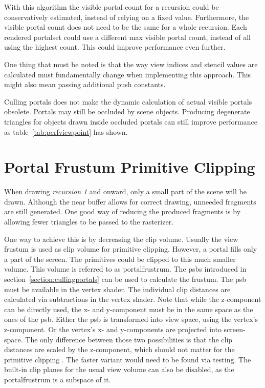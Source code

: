 With this algorithm the visible portal count for a recursion could be conservatively estimated, instead of relying on a fixed value. Furthermore, the visible portal count does not need to be the same for a whole recursion. Each rendered \gls{portalset} could use a different max visible portal count, instead of all using the highest count. This could improve performance even further.

One thing that must be noted is that the way view indices and stencil values are calculated must fundamentally change when implementing this approach. This might also mean passing additional push constants.

Culling portals does not make the dynamic calculation of actual visible portals obsolete. Portals may still be occluded by scene objects. Producing degenerate triangles for objects drawn inside occluded portals can still improve performance as table~\ref{tab:perfviewpoint} has shown.

\section{Portal Frustum Primitive Clipping}
\label{section:portalprimitiveclipping}

When drawing \textit{recursion 1} and onward, only a small part of the scene will be drawn. Although the near buffer allows for correct drawing, unneeded fragments are still generated. One good way of reducing the produced fragments is by allowing fewer triangles to be passed to the rasterizer. 

One way to achieve this is by decreasing the clip volume. Usually the view frustum is used as clip volume for primitive clipping. However, a portal fills only a part of the screen. The primitives could be clipped to this much smaller volume. This volume is referred to as \gls{portalfrustrum}. The \glspl{psb} introduced in section~\ref{section:cullingportals} can be used to calculate the frustum. The \gls{psb} must be available in the vertex shader. The individual clip distances are calculated via subtractions in the vertex shader. Note that while the z-component can be directly used, the x- and y-component must be in the same space as the ones of the \gls{psb}. Either the \gls{psb} is transformed into view space, using the vertex's z-component. Or the vertex's x- and y-components are projected into screen-space. The only difference between those two possibilities is that the clip distances are scaled by the z-component, which should not matter for the primitive clipping \cite{khronos:vulkan:spec1.1}. The faster variant would need to be found via testing. The built-in clip planes for the usual view volume can also be disabled, as the \gls{portalfrustrum} is a subspace of it.

